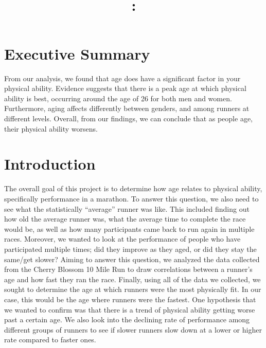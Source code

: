 \documentclass[12pt]{article}
\title{\large
	\ASSIGNMENTNAME
	\\~\\
	\COURSENUMB:
	\\
	\COURSENAME
}
\author{\MYNAME}
\date{\SUBMISSIONDATE}
\begin{document}
\maketitle


\section*{Executive Summary}

From our analysis, we found that age does have a significant factor in your physical ability. Evidence suggests that there is a peak age at which physical ability is best, occurring around the age of 26 for both men and women. Furthermore, aging affects differently between genders, and among runners at different levels. Overall, from our findings, we can conclude that as people age, their physical ability worsens.



\section*{Introduction}

The overall goal of this project is to determine how age relates to physical ability, specifically performance in a marathon. To answer this question, we also need to see what the statistically “average” runner was like. This included finding out how old the average runner was, what the average time to complete the race would be, as well as how many participants came back to run again in multiple races. Moreover, we wanted to look at the performance of people who have participated multiple times; did they improve as they aged, or did they stay the same/get slower? Aiming to answer this question, we analyzed the data collected from the Cherry Blossom 10 Mile Run to draw correlations between a runner’s age and how fast they ran the race. Finally, using all of the data we collected, we sought to determine the age at which runners were the most physically fit. In our case, this would be the age where runners were the fastest. One hypothesis that we wanted to confirm was that there is a trend of physical ability getting worse past a certain age. We also look into the declining rate of performance among different groups of runners to see if slower runners slow down at a lower or higher rate compared to faster ones.
\end{document}
